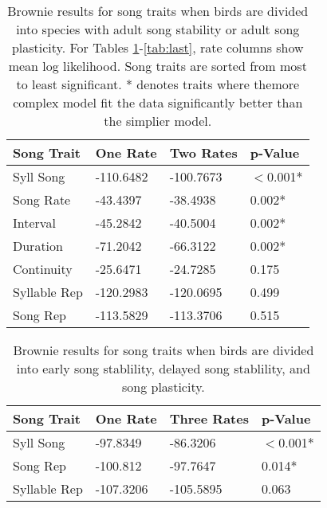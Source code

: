 \documentclass[a4paper,12pt]{article}
\begin{document}
\begin{table}[ht]
\caption{Brownie results for song traits when birds are divided into species with adult song stability or adult song plasticity.  For Tables \ref{tab:first}-\ref{tab:last}, rate columns show mean log likelihood.  Song traits are sorted from most to least significant. * denotes traits where themore complex model fit the data significantly better than the simplier model.}
\label{tab:first}
\centering
\begin{tabular}{llll}
  \hline
Song Trait & One Rate & Two Rates & p-Value \\ 
  \hline
Syll Song & -110.6482 & -100.7673 &$<$0.001* \\ 
  Song Rate & -43.4397 & -38.4938 & 0.002* \\ 
  Interval & -45.2842 & -40.5004 & 0.002* \\ 
  Duration & -71.2042 & -66.3122 & 0.002* \\ 
  Continuity & -25.6471 & -24.7285 & 0.175 \\ 
  Syllable Rep & -120.2983 & -120.0695 & 0.499 \\ 
  Song Rep & -113.5829 & -113.3706 & 0.515 \\ 
   \hline
\end{tabular}
\end{table}









\begin{table}[ht]
\caption{Brownie results for song traits when birds are divided into early song stablility, delayed song stablility, and song plasticity.}
\centering
\begin{tabular}{llll}
  \hline
Song Trait & One Rate & Three Rates & p-Value \\ 
  \hline
  Syll Song & -97.8349 & -86.3206 &$<$0.001* \\ 
  Song Rep & -100.812 & -97.7647 & 0.014* \\ 
  Syllable Rep & -107.3206 & -105.5895 & 0.063 \\ 
   \hline
\end{tabular}
\end{table}
\end{document}
